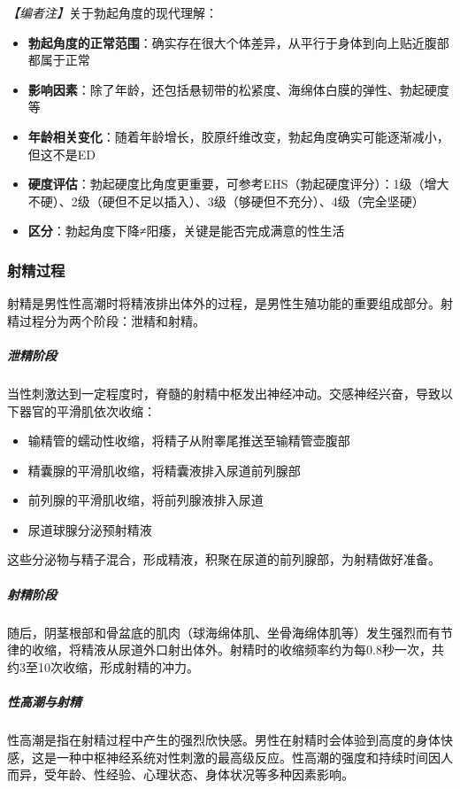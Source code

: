 \noindent\textit{【编者注】}关于勃起角度的现代理解：
\begin{itemize}
	\item \textbf{勃起角度的正常范围}：确实存在很大个体差异，从平行于身体到向上贴近腹部都属于正常
	\item \textbf{影响因素}：除了年龄，还包括悬韧带的松紧度、海绵体白膜的弹性、勃起硬度等
	\item \textbf{年龄相关变化}：随着年龄增长，胶原纤维改变，勃起角度确实可能逐渐减小，但这不是ED
	\item \textbf{硬度评估}：勃起硬度比角度更重要，可参考EHS（勃起硬度评分）：1级（增大不硬）、2级（硬但不足以插入）、3级（够硬但不充分）、4级（完全坚硬）
	\item \textbf{区分}：勃起角度下降≠阳痿，关键是能否完成满意的性生活
\end{itemize}

\subsubsection{射精过程}

射精是男性性高潮时将精液排出体外的过程，是男性生殖功能的重要组成部分。射精过程分为两个阶段：泄精和射精。

\subparagraph{泄精阶段}

当性刺激达到一定程度时，脊髓的射精中枢发出神经冲动。交感神经兴奋，导致以下器官的平滑肌依次收缩：
\begin{itemize}
    \item 输精管的蠕动性收缩，将精子从附睾尾推送至输精管壶腹部
    \item 精囊腺的平滑肌收缩，将精囊液排入尿道前列腺部
    \item 前列腺的平滑肌收缩，将前列腺液排入尿道
    \item 尿道球腺分泌预射精液
\end{itemize}
这些分泌物与精子混合，形成精液，积聚在尿道的前列腺部，为射精做好准备。

\subparagraph{射精阶段}

随后，阴茎根部和骨盆底的肌肉（球海绵体肌、坐骨海绵体肌等）发生强烈而有节律的收缩，将精液从尿道外口射出体外。射精时的收缩频率约为每0.8秒一次，共约3至10次收缩，形成射精的冲力。

\subparagraph{性高潮与射精}

性高潮是指在射精过程中产生的强烈欣快感。男性在射精时会体验到高度的身体快感，这是一种中枢神经系统对性刺激的最高级反应。性高潮的强度和持续时间因人而异，受年龄、性经验、心理状态、身体状况等多种因素影响。

